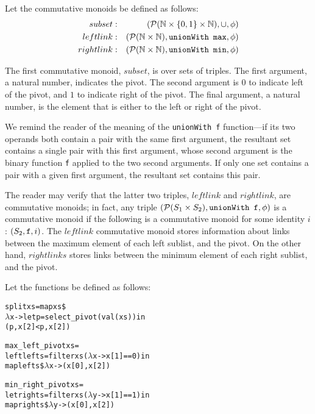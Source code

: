 Let the commutative monoids be defined as follows:
\begin{eqnarray*}
subset &:& \left(\mathcal{P}(\mathbb{N} \times \{0,1\} \times \mathbb{N}), \cup, \phi\right) \\
leftlink &:& \left(\mathcal{P}(\mathbb{N} \times \mathbb{N}), {\tt unionWith \,\,\,max}, \phi\right) \\
rightlink &:& \left(\mathcal{P}(\mathbb{N} \times \mathbb{N}), {\tt unionWith \,\,\,min}, \phi \right)
\end{eqnarray*}

The first commutative monoid, $subset$, is over sets of triples.  The first argument, a natural number, indicates the pivot.  The second argument is $0$ to indicate left of the pivot, and $1$ to indicate right of the pivot.  The final argument, a natural number, is the element that is either to the left or right of the pivot.

We remind the reader of the meaning of the {\tt unionWith f} function---if its two operands both contain a pair with the same first argument, the resultant set contains a single pair with this first argument, whose second argument is the binary function {\tt f} applied to the two second arguments.  If only one set contains a pair with a given first argument, the resultant set contains this pair.

The reader may verify that the latter two triples, $leftlink$ and $rightlink$, are commutative monoids; in fact, any triple $\left(\mathcal{P}(S_1 \times S_2), {\tt unionWith \,\,\, f}, \phi\right)$ is a commutative monoid if the following is a commutative monoid for some identity $i$: $\left(S_2, {\tt f}, i\right)$.  The $leftlink$ commutative monoid stores information about links between the maximum element of each left sublist, and the pivot.  On the other hand, $rightlinks$ stores links between the minimum element of each right sublist, and the pivot.

Let the functions be defined as follows:
\begin{alltt}
split xs = map xs \$
    \(\lambda\)x -> let p = select_pivot(val(xs)) in
        (p, x[2] < p, x[2])

max\_left\_pivot xs = 
    left lefts = filter xs (\(\lambda\)x -> x[1] == 0) in
        map lefts \$ \(\lambda\)x -> (x[0], x[2])

min\_right\_pivot xs = 
    let rights = filter xs (\(\lambda\)y -> x[1] == 1) in
        map rights \$ \(\lambda\)y -> (x[0], x[2])
\end{alltt}

